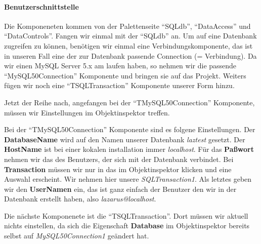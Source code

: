 \paragraph{Benutzerschnittstelle}
Die Komponeneten kommen von der Palettenseite "`SQLdb"', "`DataAccess"' und "`DataControls"'.
 \label{fig:MySQLSimple01A} 
Fangen wir einmal mit der "`SQLdb"' an. Um auf eine Datenbank zugreifen zu können, benötigen wir einmal eine Verbindungskomponente, das ist in unseren Fall eine der zur Datenbank passende Connection (= Verbindung). Da wir einen MySQL Server 5.x am laufen haben, so nehmen wir die passende "`MySQL50Connection"' Komponente und bringen sie auf das Projekt.
 \label{fig:MySQLSimple03} 
Weiters fügen wir noch eine "`TSQLTransaction"' Komponente unserer Form hinzu.

Jetzt der Reihe nach, angefangen bei der "`TMySQL50\-Connection"' Komponente, müssen wir Einstellungen im Objektinspektor treffen. 

Bei der "`TMySQL50Connection"' Komponente sind es folgene Einstellungen. Der \textbf{DatabaseName} wird auf den Namen unserer Datenbank \emph{laztest} gesetzt. Der \textbf{HostName} ist bei einer kokalen installation immer \emph{localhost}. Für das \textbf{Paßwort} nehmen wir das des Benutzers, der sich mit der Datenbank verbindet. Bei \textbf{Transaction} müssen wir nur in das im Objektinspektor klicken und eine Auswahl erscheint. Wir nehmen hier unsere \emph{SQLTransaction1}. Als letztes geben wir den \textbf{UserNamen} ein, das ist ganz einfach der Benutzer den wir in der Datenbank erstellt haben, also \emph{lazarus@localhost}.

Die nächste Komponenete ist die "`TSQLTransaction"'. Dort müssen wir aktuell nichts einstellen, da sich die Eigenschaft \textbf{Database} im Objektinspektor bereits selbst auf \emph{MySQL50Connection1} geändert hat.

